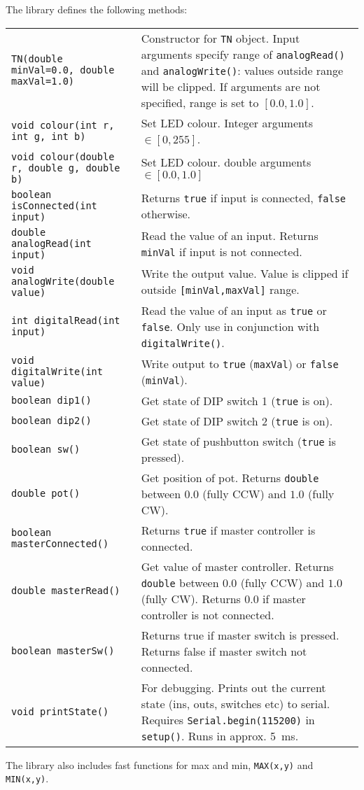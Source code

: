 \documentclass[a4paper,10pt]{article}
\begin{document}
The library defines the following methods:
\begin{table}[h!]
\begin{tabular}{l p{9cm} }
\verb+TN(double minVal=0.0, double maxVal=1.0)+ & Constructor for \verb|TN| object.  Input arguments specify range of \verb|analogRead()| and \verb|analogWrite()|: values outside range will be clipped.  If arguments are not specified, range is set to $[0.0,1.0]$.\\
\verb+void colour(int r, int g, int b)+ & Set LED colour.  Integer arguments $\in [0,255]$.  \\
\verb+void colour(double r, double g, double b)+ & Set LED colour.  double arguments $\in [0.0,1.0]$ \\
\verb+boolean isConnected(int input)+ & Returns \verb|true| if input is connected, \verb|false| otherwise.\\
\verb+double analogRead(int input)+ & Read the value of an input.  Returns \verb|minVal| if input is not connected.\\
\verb+void analogWrite(double value)+ & Write the output value.  Value is clipped if outside \verb|[minVal,maxVal]| range.\\
\verb+int digitalRead(int input)+ & Read the value of an input as \verb|true| or \verb|false|.  Only use in conjunction with \verb|digitalWrite()|.\\
\verb+void digitalWrite(int value)+ & Write output to \verb|true| (\verb|maxVal|) or \verb|false| (\verb|minVal|). \\
\verb+boolean dip1()+ & Get state of DIP switch 1 (\verb|true| is on).\\
\verb+boolean dip2()+ & Get state of DIP switch 2 (\verb|true| is on).\\
\verb+boolean sw()+ & Get state of pushbutton switch (\verb|true| is pressed).\\
\verb+double pot()+ & Get position of pot.  Returns \verb|double| between $0.0$ (fully CCW) and $1.0$ (fully CW).\\
\verb+boolean masterConnected()+ & Returns \verb|true| if master controller is connected.  \\
\verb+double masterRead()+ & Get value of master controller.  Returns \verb|double| between $0.0$ (fully CCW) and $1.0$ (fully CW).  Returns $0.0$ if master controller is not connected. \\
\verb+boolean masterSw()+ & Returns true if master switch is pressed.  Returns false if master switch not connected.\\
\verb+void printState()+ & For debugging.  Prints out the current state (ins, outs, switches etc) to serial.  Requires \verb|Serial.begin(115200)| in \verb|setup()|.  Runs in approx. 5~ms. \\
\end{tabular}
\end{table}

The library also includes fast functions for max and min, \verb|MAX(x,y)| and \verb|MIN(x,y)|.
\end{document}
